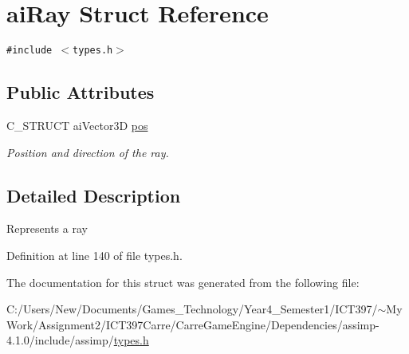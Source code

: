 \hypertarget{structai_ray}{
\section{aiRay Struct Reference}
\label{structai_ray}
}
{\tt \#include $<$types.h$>$}

\subsection*{Public Attributes}
\begin{CompactItemize}
\item 
\hypertarget{structai_ray_312f663a7d2580b1b3beb52ffd4ab4c9}{
C\_\-STRUCT aiVector3D \hyperlink{structai_ray_312f663a7d2580b1b3beb52ffd4ab4c9}{pos}}
\label{structai_ray_312f663a7d2580b1b3beb52ffd4ab4c9}

\begin{CompactList}\small\item\em Position and direction of the ray. \item\end{CompactList}\end{CompactItemize}


\subsection{Detailed Description}
Represents a ray 

Definition at line 140 of file types.h.

The documentation for this struct was generated from the following file:\begin{CompactItemize}
\item 
C:/Users/New/Documents/Games\_\-Technology/Year4\_\-Semester1/ICT397/$\sim$My Work/Assignment2/ICT397Carre/CarreGameEngine/Dependencies/assimp-4.1.0/include/assimp/\hyperlink{types_8h}{types.h}\end{CompactItemize}
